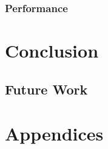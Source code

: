 \documentclass{UoYCSproject}
\begin{document}



\subsection{Performance}
	


\chapter{Conclusion}


\section{Future Work}



	



\chapter{Appendices}
\end{document}
